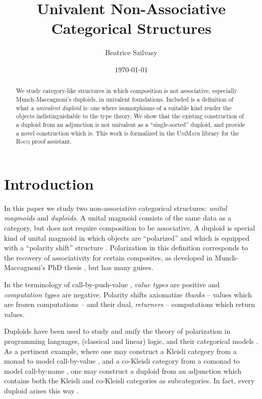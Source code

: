 \documentclass[runningheads]{llncs}
\author{Beatrice Szilvasy\orcidID{0009-0003-2902-6554}}
\date{\today}
\title{Univalent Non\hyp{}Associative Categorical Structures}
\begin{document}

\maketitle
\begin{abstract}
We study category\hyp{}like structures in which composition is not
associative, especially Munch\hyp{}Maccagnoni's duploids, in univalent
foundations. Included is a definition of what a \emph{univalent duploid}
is: one where isomorphisms of a suitable kind render the objects
indistinguishable to the type theory. We show that the existing
construction of a duploid from an adjunction is not univalent as
a ``single\hyp{}sorted'' duploid, and provide a novel construction which
is. This work is formalized in the \textsc{UniMath}
library for the \textsc{Rocq} proof assistant.

\end{abstract}
\section{Introduction}
\label{sec:introduction}
In this paper we study two non\hyp{}associative categorical structures:
\emph{unital magmoids} and \emph{duploids}. A unital magmoid consists of the
same data as a category, but does not require composition to be
associative. A duploid is special kind of unital magmoid in which
objects are ``polarized'' and which is equipped with a ``polarity shift'' structure
\cite{MunchMaccagnoni14}. Polarization in this definition corresponds
to the recovery of associativity for certain composites, as developed
in Munch\hyp{}Maccagnoni's PhD thesis \cite{MunchMaccagnoni13}, but has
many guises.

In the terminology of call\hyp{}by\hyp{}push\hyp{}value \cite{Levy99,Levy17}, \emph{value types}
are positive and \emph{computation types} are negative. Polarity shifts
axiomatize \emph{thunks} -- values which are frozen computations -- and
their dual, \emph{returners} -- computations which return values.

Duploids have been used to study and unify the theory of polarization
in programming languages, (classical and linear) logic, and their
categorical models
\cite{MunchMaccagnoni13,Clairambault17,Mangel25,Mangel26}. As a
pertinent example, where one may construct a Kleisli category from a
monad to model call\hyp{}by\hyp{}value
\cite{Moggi91,MunchMaccagnoni14,Fuhrmann99}, and a co\hyp{}Kleisli
category from a comonad to model call\hyp{}by\hyp{}name
\cite{Mangel25,MunchMaccagnoni13}, one may construct a duploid from
an adjunction which contains both the Kleisli and co\hyp{}Kleisli
categories as subcategories. In fact, every duploid arises this way
\cite{MunchMaccagnoni14}.
\end{document}
